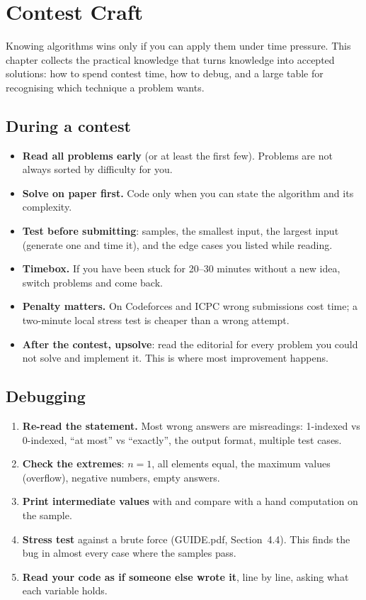 \chapter{Contest Craft}\label{ch:craft}

Knowing algorithms wins only if you can apply them under time pressure. This chapter collects the practical knowledge that
turns knowledge into accepted solutions: how to spend contest time, how to debug, and a large table for recognising which
technique a problem wants.

\section[During a contest]{During a contest \hfill \bronze}

\begin{itemize}
  \item \textbf{Read all problems early} (or at least the first few). Problems are not always sorted by difficulty for you.
  \item \textbf{Solve on paper first.} Code only when you can state the algorithm and its complexity.
  \item \textbf{Test before submitting}: samples, the smallest input, the largest input (generate one and time it), and the edge
        cases you listed while reading.
  \item \textbf{Timebox.} If you have been stuck for 20--30 minutes without a new idea, switch problems and come back.
  \item \textbf{Penalty matters.} On Codeforces and ICPC wrong submissions cost time; a two-minute local stress test is cheaper
        than a wrong attempt.
  \item \textbf{After the contest, upsolve}: read the editorial for every problem you could not solve and implement it. This is
        where most improvement happens.
\end{itemize}

\section[Debugging]{Debugging \hfill \bronze}

\begin{enumerate}
  \item \textbf{Re-read the statement.} Most wrong answers are misreadings: 1-indexed vs 0-indexed, ``at most'' vs ``exactly'',
        the output format, multiple test cases.
  \item \textbf{Check the extremes}: $n = 1$, all elements equal, the maximum values (overflow), negative numbers, empty answers.
  \item \textbf{Print intermediate values} with  and compare with a hand computation on the sample.
  \item \textbf{Stress test} against a brute force (GUIDE.pdf, Section~4.4). This finds the bug in almost every case where the
        samples pass.
  \item \textbf{Read your code as if someone else wrote it}, line by line, asking what each variable holds.
\end{enumerate}

